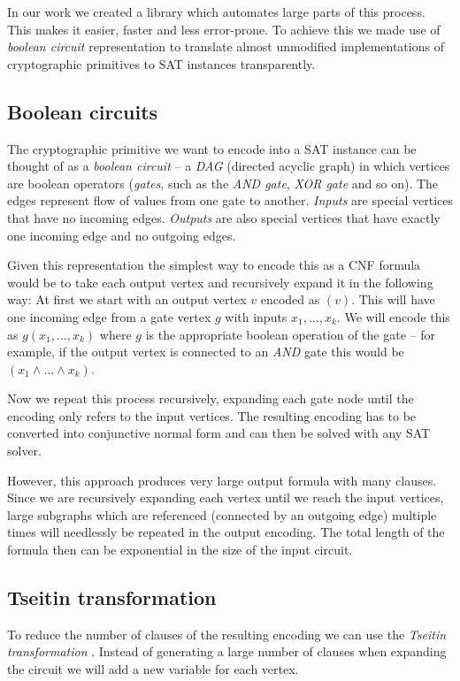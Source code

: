 In our work we created a library \cite{papay2016code} which automates large parts of this process.
This makes it easier, faster and less error-prone.
To achieve this we made use of \emph{boolean circuit} representation to translate almost unmodified implementations of cryptographic primitives to SAT instances transparently.

\subsection{Boolean circuits}
The cryptographic primitive we want to encode into a SAT instance can be thought of as a \emph{boolean circuit} -- a \emph{DAG} (directed acyclic graph) in which vertices are boolean operators (\emph{gates}, such as the \emph{AND gate}, \emph{XOR gate} and so on).
The edges represent flow of values from one gate to another.
\emph{Inputs} are special vertices that have no incoming edges.
\emph{Outputs} are also special vertices that have exactly one incoming edge and no outgoing edges.

Given this representation the simplest way to encode this as a CNF formula would be to take each output vertex and recursively expand it in the following way:
At first we start with an output vertex $v$ encoded as $(v)$.
This will have one incoming edge from a gate vertex $g$ with inputs $x_1, \dots, x_k$.
We will encode this as $g(x_1, \dots, x_k)$ where $g$ is the appropriate boolean operation of the gate -- for example, if the output vertex is connected to an \emph{AND} gate this would be $(x_1 \land \dots \land x_k)$.

Now we repeat this process recursively, expanding each gate node until the encoding only refers to the input vertices.
The resulting encoding has to be converted into conjunctive normal form and can then be solved with any SAT solver.

However, this approach produces very large output formula with many clauses.
Since we are recursively expanding each vertex until we reach the input vertices, large subgraphs which are referenced (connected by an outgoing edge) multiple times will needlessly be repeated in the output encoding.
The total length of the formula then can be exponential in the size of the input circuit.

\subsection{Tseitin transformation}
\label{sec:tseitin}
To reduce the number of clauses of the resulting encoding we can use the \emph{Tseitin transformation} \cite{tseitin1983complexity}.
Instead of generating a large number of clauses when expanding the circuit we will add a new variable for each vertex.

